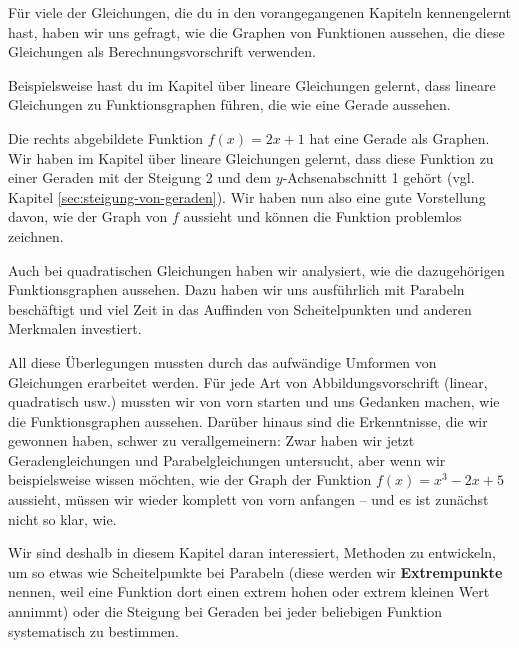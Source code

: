 \documentclass[../../main.tex]{subfiles}
\begin{document}
Für viele der Gleichungen, die du in den vorangegangenen Kapiteln kennengelernt hast, haben wir uns gefragt, wie die Graphen von Funktionen aussehen, die diese Gleichungen als Berechnungsvorschrift verwenden.

Beispielsweise hast du im Kapitel über lineare Gleichungen gelernt, dass lineare Gleichungen zu Funktionsgraphen führen, die wie eine Gerade aussehen.

\begin{example}{}
    Die rechts abgebildete Funktion $f(x)=2x+1$ hat eine Gerade als Graphen. Wir haben im Kapitel über lineare Gleichungen gelernt, dass diese Funktion zu einer Geraden mit der Steigung 2 und dem $y$-Achsenabschnitt 1 gehört (vgl. Kapitel \ref{sec:steigung-von-geraden}). Wir haben nun also eine gute Vorstellung davon, wie der Graph von $f$ aussieht und können die Funktion problemlos zeichnen.
\end{example}

Auch bei quadratischen Gleichungen haben wir analysiert, wie die dazugehörigen Funktionsgraphen aussehen. Dazu haben wir uns ausführlich mit Parabeln beschäftigt und viel Zeit in das Auffinden von Scheitelpunkten und anderen Merkmalen investiert.

All diese Überlegungen mussten durch das aufwändige Umformen von Gleichungen erarbeitet werden. Für jede Art von Abbildungsvorschrift (linear, quadratisch usw.) mussten wir von vorn starten und uns Gedanken machen, wie die Funktionsgraphen aussehen. Darüber hinaus sind die Erkenntnisse, die wir gewonnen haben, schwer zu verallgemeinern: Zwar haben wir jetzt Geradengleichungen und Parabelgleichungen untersucht, aber wenn wir beispielsweise wissen möchten, wie der Graph der Funktion $f(x)=x^3-2x+5$ aussieht, müssen wir wieder komplett von vorn anfangen -- und es ist zunächst nicht so klar, wie.

Wir sind deshalb in diesem Kapitel daran interessiert, Methoden zu entwickeln, um so etwas wie Scheitelpunkte bei Parabeln (diese werden wir \textbf{Extrempunkte} nennen, weil eine Funktion dort einen extrem hohen oder extrem kleinen Wert annimmt) oder die Steigung bei Geraden bei jeder beliebigen Funktion systematisch zu bestimmen.
\end{document}
